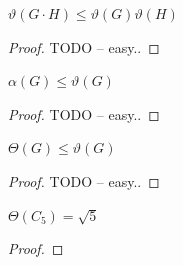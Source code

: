 \begin{lm}
    $\vartheta(G \cdot H) \leq \vartheta(G) \vartheta(H)$
\end{lm}

\begin{proof}
    TODO -- easy..
\end{proof}

\begin{lm}
    $\alpha(G) \leq \vartheta(G)$
\end{lm}

\begin{proof}
    TODO -- easy..
\end{proof}

\begin{lm}
    $\Theta(G) \leq \vartheta(G)$
\end{lm}

\begin{proof}
    TODO -- easy..
\end{proof}

\begin{vt}
    $\Theta(C_5) = \sqrt{5}$
\end{vt}

\begin{proof}

\end{proof}
